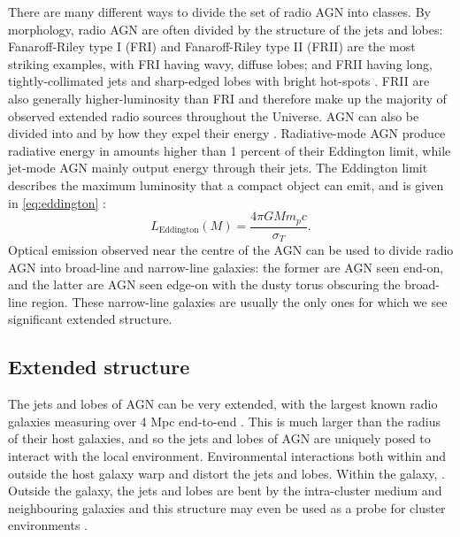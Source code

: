         There are many different ways to divide the set of radio AGN into classes. By morphology, radio AGN are often divided by the structure of the jets and lobes: Fanaroff-Riley type I (FRI) and Fanaroff-Riley type II (FRII) are the most striking examples, with FRI having wavy, diffuse lobes; and FRII having long, tightly-collimated jets and sharp-edged lobes with bright hot-spots \citep{urry_unified_1995}. FRII are also generally higher-luminosity \citep{fanaroff_morphology_1974} than FRI and therefore make up the majority of observed extended radio sources throughout the Universe. AGN can also be divided into  and  by how they expel their energy \citep{heckman_coevolution_2014}. Radiative-mode AGN produce radiative energy in amounts higher than 1 percent of their Eddington limit, while jet-mode AGN mainly output energy through their jets. The Eddington limit describes the maximum luminosity that a compact object can emit, and is given in \autoref{eq:eddington} \citep{rybicki_radiative_1979}:
        \begin{equation}
            L_{\mathrm{Eddington}}(M) = \frac{4\pi G M m_p c}{\sigma_T}.
            \label{eq:eddington}
        \end{equation}
        Optical emission observed near the centre of the AGN can be used to divide radio AGN into broad-line and narrow-line galaxies: the former are AGN seen end-on, and the latter are AGN seen edge-on with the dusty torus obscuring the broad-line region. These narrow-line galaxies are usually the only ones for which we see significant extended structure.

    \subsection{Extended structure}
    \label{sec:extended-structure-of-agn}

        The jets and lobes of AGN can be very extended, with the largest known radio galaxies measuring over 4 Mpc end-to-end \citep{machalski_understanding_2011}. This is much larger than the radius of their host galaxies, and so the jets and lobes of AGN are uniquely posed to interact with the local environment. Environmental interactions both within and outside the host galaxy warp and distort the jets and lobes. Within the galaxy, . Outside the galaxy, the jets and lobes are bent by the intra-cluster medium and neighbouring galaxies \citep[ICM;][]{garon_radio_2019, rodman_radio_2019} and this structure may even be used as a probe for cluster environments \citep{banfield_radio_2016}.

